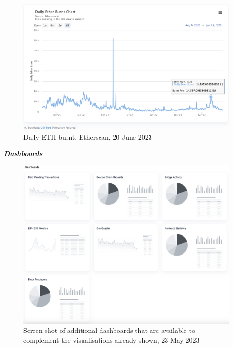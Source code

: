 \documentclass[UTF8]{article}
\begin{document}
{\begin{figure}[htbp]
\begin{center}
\includegraphics[width=0.9\linewidth]{images/ethburnt}
\caption{Daily ETH burnt. Etherscan, 20 June 2023}
\label{fig:ethburnt}
\end{center}
\end{figure}

\clearpage
\textit{\textbf{Dashboards}}
\begin{figure}[htbp]
\begin{center}
\includegraphics[width=0.9\linewidth]{images/dashboards}
\caption{Screen shot of additional dashboards that are available to complement the visualisations already shown, 23 May 2023}
\label{fig:dashboards}
\end{center}
\end{figure}

}
\end{document}
